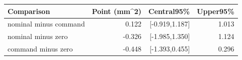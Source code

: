 \begin{tabular}{lrrr}
\toprule
Comparison & Point (mm\textasciicircum{}2) & Central95\% & Upper95\%\\
\midrule
nominal minus command & 0.122 & [-0.919,1.187] & 1.013\\
nominal minus zero & -0.326 & [-1.985,1.350] & 1.124\\
command minus zero & -0.448 & [-1.393,0.455] & 0.296\\
\bottomrule
\end{tabular}
